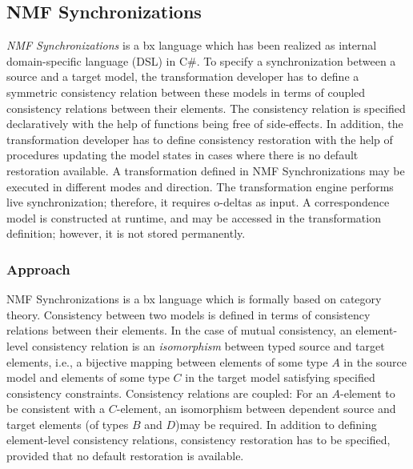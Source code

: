 
\subsection{NMF Synchronizations}
\label{sec:NMF}



\emph{NMF Synchronizations} \cite{SoSyM2017-Hinkel} is a bx language which has been realized as internal domain-specific language (DSL) in C\#. To specify a synchronization between a source and a target model, the transformation developer has to define a symmetric consistency relation between these models in terms of coupled consistency relations between their elements. The consistency relation is specified declaratively with the help of functions being free of side-effects. In addition, the transformation developer has to define consistency restoration with the help of procedures updating the model states in cases where there is no default restoration available. A transformation defined in NMF Synchronizations may be executed in different modes and direction. The transformation engine performs live synchronization; therefore, it requires o-deltas as input. A correspondence model is constructed at runtime, and may be accessed in the transformation definition; however, it is not stored permanently.

\subsubsection{Approach}
\label{sec:ApproachNMF}

NMF Synchronizations \cite{SoSyM2017-Hinkel}is a bx language which is formally based on category theory. Consistency between two models is defined in terms of consistency relations between their elements. In the case of mutual consistency, an element-level consistency relation is an \emph{isomorphism} between typed source and target elements, i.e., a bijective mapping between elements of some type $A$ in the source model and elements of some type $C$ in the target model satisfying specified consistency constraints. Consistency relations are coupled: For an $A$-element to be consistent with a $C$-element, an isomorphism between dependent source and target elements (of types $B$ and $D$)may be required. In addition to defining element-level consistency relations, consistency restoration has to be specified, provided that no default restoration is available.

